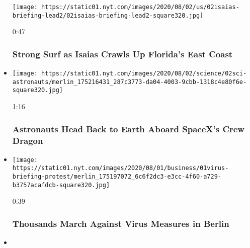 \begin{itemize}
  \texttt{[image: https://static01.nyt.com/images/2020/08/02/us/02isaias-briefing-lead2/02isaias-briefing-lead2-square320.jpg]}

  0:47

  \hypertarget{strong-surf-as-isaias-crawls-up-floridas-east-coast}{%
  \subsubsection{Strong Surf as Isaias Crawls Up Florida's East
  Coast}\label{strong-surf-as-isaias-crawls-up-floridas-east-coast}}
\item
  \href{https://www.nytimes.com/video/us/100000007268936/spacex-departs-international-space-station.html?action=click\&module=video-series-bar\&region=header\&pgtype=Article\&playlistId=video/latest-video}{}

  \texttt{[image: https://static01.nyt.com/images/2020/08/02/science/02sci-astronauts/merlin\_175216431\_287c3773-da04-4003-9cbb-1318c4e80f6e-square320.jpg]}

  1:16

  \hypertarget{astronauts-head-back-to-earth-aboard-spacexs-crew-dragon}{%
  \subsubsection{Astronauts Head Back to Earth Aboard SpaceX's Crew
  Dragon}\label{astronauts-head-back-to-earth-aboard-spacexs-crew-dragon}}
\item
  \href{https://www.nytimes.com/video/world/europe/100000007268465/coronavirus-protest-germany.html?action=click\&module=video-series-bar\&region=header\&pgtype=Article\&playlistId=video/latest-video}{}

  \texttt{[image: https://static01.nyt.com/images/2020/08/01/business/01virus-briefing-protest/merlin\_175197072\_6c6f2dc3-e3cc-4f60-a729-b3757acafdcb-square320.jpg]}

  0:39

  \hypertarget{thousands-march-against-virus-measures-in-berlin}{%
  \subsubsection{Thousands March Against Virus Measures in
  Berlin}\label{thousands-march-against-virus-measures-in-berlin}}
\item
  \href{https://www.nytimes.com/video/world/middleeast/100000007268443/iran-united-states-nuclear-program-negotiation.html?action=click\&module=video-series-bar\&region=header\&pgtype=Article\&playlistId=video/latest-video}{}


\end{itemize}
